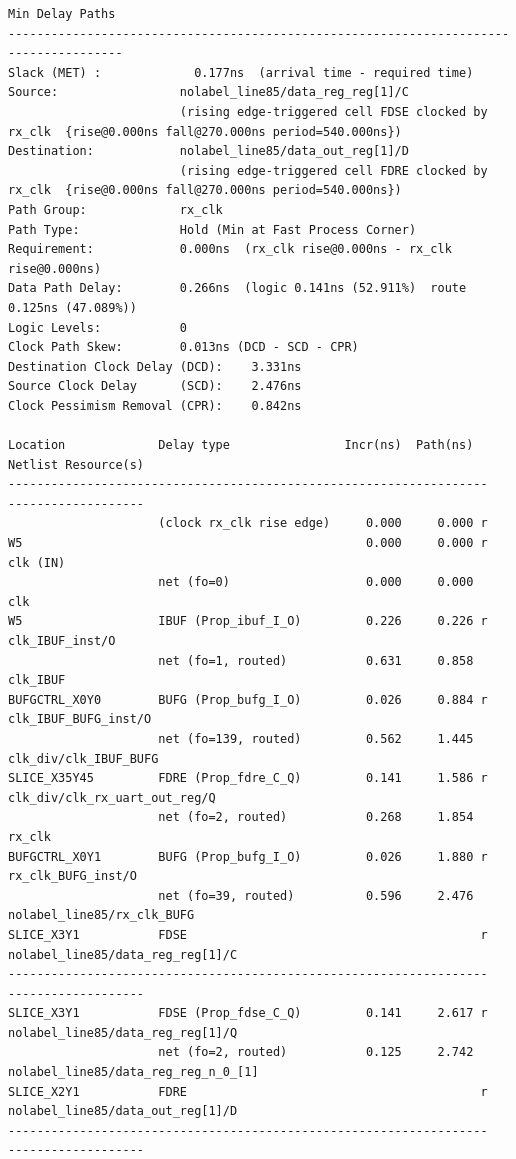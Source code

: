 \documentclass{report}
\newenvironment{narrowmargins}{
    \begin{adjustwidth}{-0.75in}{0.25in} %
}{
    \end{adjustwidth}
}
\begin{document}
\begin{narrowmargins}
\begin{verbatim}
Min Delay Paths
--------------------------------------------------------------------------------------
Slack (MET) :             0.177ns  (arrival time - required time)
Source:                 nolabel_line85/data_reg_reg[1]/C
                        (rising edge-triggered cell FDSE clocked by rx_clk  {rise@0.000ns fall@270.000ns period=540.000ns})
Destination:            nolabel_line85/data_out_reg[1]/D
                        (rising edge-triggered cell FDRE clocked by rx_clk  {rise@0.000ns fall@270.000ns period=540.000ns})
Path Group:             rx_clk
Path Type:              Hold (Min at Fast Process Corner)
Requirement:            0.000ns  (rx_clk rise@0.000ns - rx_clk rise@0.000ns)
Data Path Delay:        0.266ns  (logic 0.141ns (52.911%)  route 0.125ns (47.089%))
Logic Levels:           0  
Clock Path Skew:        0.013ns (DCD - SCD - CPR)
Destination Clock Delay (DCD):    3.331ns
Source Clock Delay      (SCD):    2.476ns
Clock Pessimism Removal (CPR):    0.842ns

Location             Delay type                Incr(ns)  Path(ns)    Netlist Resource(s)
-------------------------------------------------------------------    -------------------
                     (clock rx_clk rise edge)     0.000     0.000 r  
W5                                                0.000     0.000 r  clk (IN)
                     net (fo=0)                   0.000     0.000    clk
W5                   IBUF (Prop_ibuf_I_O)         0.226     0.226 r  clk_IBUF_inst/O
                     net (fo=1, routed)           0.631     0.858    clk_IBUF
BUFGCTRL_X0Y0        BUFG (Prop_bufg_I_O)         0.026     0.884 r  clk_IBUF_BUFG_inst/O
                     net (fo=139, routed)         0.562     1.445    clk_div/clk_IBUF_BUFG
SLICE_X35Y45         FDRE (Prop_fdre_C_Q)         0.141     1.586 r  clk_div/clk_rx_uart_out_reg/Q
                     net (fo=2, routed)           0.268     1.854    rx_clk
BUFGCTRL_X0Y1        BUFG (Prop_bufg_I_O)         0.026     1.880 r  rx_clk_BUFG_inst/O
                     net (fo=39, routed)          0.596     2.476    nolabel_line85/rx_clk_BUFG
SLICE_X3Y1           FDSE                                         r  nolabel_line85/data_reg_reg[1]/C
-------------------------------------------------------------------    -------------------
SLICE_X3Y1           FDSE (Prop_fdse_C_Q)         0.141     2.617 r  nolabel_line85/data_reg_reg[1]/Q
                     net (fo=2, routed)           0.125     2.742    nolabel_line85/data_reg_reg_n_0_[1]
SLICE_X2Y1           FDRE                                         r  nolabel_line85/data_out_reg[1]/D
-------------------------------------------------------------------    -------------------


\end{verbatim}
\end{narrowmargins}
\end{document}
